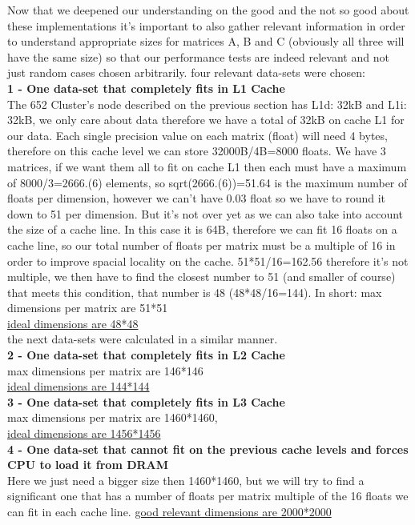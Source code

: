 \documentclass[journal]{IEEEtran}
\begin{document}
Now that we deepened our understanding on the good and the not so good about these implementations it's important to also gather relevant information in order to understand appropriate sizes for matrices A, B and C (obviously all three will have the same size) so that our performance tests are indeed relevant and not just random cases chosen arbitrarily. four relevant data-sets were chosen:\\
\textbf{1 - One data-set that completely fits in L1 Cache}\\
The 652 Cluster's node described on the previous section has L1d: 32kB and L1i: 32kB, we only care about data therefore we have a total of 32kB on cache L1 for our data. Each single precision value on each matrix (float) will need 4 bytes, therefore on this cache level we can store 32000B/4B=8000 floats. We have 3 matrices, if we want them all to fit on cache L1 then each must have a maximum of 8000/3=2666.(6) elements, so sqrt(2666.(6))=51.64 is the maximum number of floats per dimension, however we can't have 0.03 float so we have to round it down to 51 per dimension. But it's not over yet as we can also take into account the size of a cache line. In this case it is 64B, therefore we can fit 16 floats on a cache line, so our total number of floats per matrix must be a multiple of 16 in order to improve spacial locality on the cache. 51*51/16=162.56 therefore it's not multiple, we then have to find the closest number to 51 (and smaller of course) that meets this condition, that number is 48 (48*48/16=144). In short: max dimensions per matrix are 51*51\\
\underline{ideal dimensions are 48*48}\\ 
the next data-sets were calculated in a similar manner.\\
\textbf{2 - One data-set that completely fits in L2 Cache}\\
max dimensions per matrix are 146*146\\
\underline{ideal dimensions are 144*144}\\ 
\textbf{3 - One data-set that completely fits in L3 Cache}\\
max dimensions per matrix are 1460*1460,\\
\underline{ideal dimensions are 1456*1456}\\ 
\textbf{4 - One data-set that cannot fit on the previous cache levels and forces CPU to load it from DRAM}\\
Here we just need a bigger size then 1460*1460, but we will try to find a significant one that has a number of floats per matrix multiple of the 16 floats we can fit in each cache line.
\underline{good relevant dimensions are 2000*2000}
\end{document}
